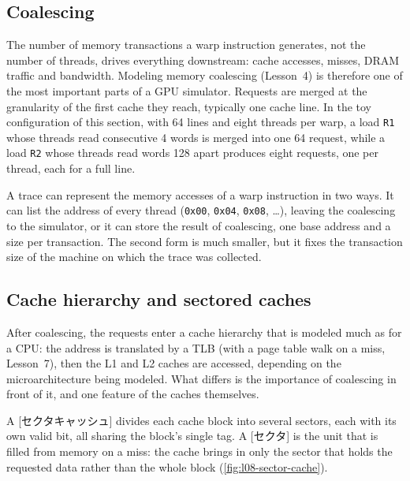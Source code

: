 \documentclass[../main.tex]{subfiles}
\begin{document}
\subsection{Coalescing}

The number of memory transactions a warp instruction generates, not
the number of threads, drives everything downstream: cache accesses,
misses, DRAM traffic and bandwidth.  Modeling memory coalescing
(Lesson~4) is therefore one of the most important parts of a GPU
simulator.  Requests are merged at the granularity of the first cache
they reach, typically one cache line.  In the toy configuration of this
section, with \SI{64}{\byte} lines and eight threads per warp, a load
\texttt{R1} whose threads read consecutive \SI{4}{\byte} words is
merged into one \SI{64}{\byte} request, while a load \texttt{R2} whose
threads read words \SI{128}{\byte} apart produces eight requests, one
per thread, each for a full line.

A trace can represent the memory accesses of a warp instruction in
two ways.  It can list the address of every thread (\texttt{0x00},
\texttt{0x04}, \texttt{0x08}, \dots), leaving the coalescing to the
simulator, or it can store the result of coalescing, one base address
and a size per transaction.  The second form is much smaller, but it
fixes the transaction size of the machine on which the trace was
collected.

\subsection{Cache hierarchy and sectored caches}

After coalescing, the requests enter a cache hierarchy that is modeled
much as for a CPU: the address is translated by a TLB (with a page
table walk on a miss, Lesson~7), then the L1 and L2 caches are
accessed, depending on the microarchitecture being modeled.  What
differs is the importance of coalescing in front of it, and one
feature of the caches themselves.

\begin{definition}
  \label{def:l08-sectored-cache}
  A [セクタキャッシュ] divides each cache block
  into several sectors, each with its own valid bit, all sharing the
  block's single tag.  A [セクタ] is the unit that is
  filled from memory on a miss: the cache brings in only the sector
  that holds the requested data rather than the whole block
  (\cref{fig:l08-sector-cache}).
\end{definition}
\end{document}
